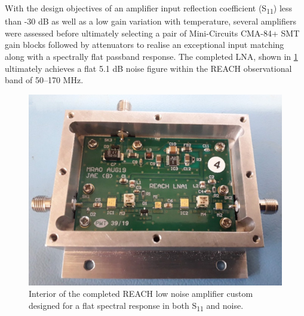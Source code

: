 With the design objectives of an amplifier input reflection coefficient (S\textsubscript{11}) less than -30 dB as well as a low gain variation with temperature, several amplifiers were assessed before ultimately selecting a pair of Mini-Circuits CMA-84+ SMT gain blocks followed by attenuators to realise an exceptional input matching along with a spectrally flat passband response. The completed LNA, shown in \cref{fig:lna} ultimately achieves a flat 5.1 dB noise figure within the REACH observational band of 50--170 MHz.
\begin{figure}
    \centering
    \includegraphics[scale=0.5]{lna}
    \caption{Interior of the completed REACH low noise amplifier custom designed for a flat spectral response in both S\textsubscript{11} and noise.}
    \label{fig:lna}
\end{figure}

